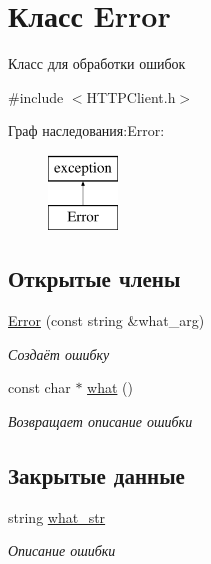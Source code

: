 \hypertarget{classError}{}\section{Класс Error}
\label{classError}


Класс для обработки ошибок  




{\ttfamily \#include $<$H\+T\+T\+P\+Client.\+h$>$}

Граф наследования\+:Error\+:\begin{figure}[H]
\begin{center}
\leavevmode
\includegraphics[height=2.000000cm]{classError}
\end{center}
\end{figure}
\subsection*{Открытые члены}
\begin{DoxyCompactItemize}
\item 
\mbox{\hyperlink{classError_a66e4b23485049435a2d454f80083f38c}{Error}} (const string \&what\+\_\+arg)
\begin{DoxyCompactList}\small\item\em Создаёт ошибку \end{DoxyCompactList}\item 
const char $\ast$ \mbox{\hyperlink{classError_a57dd37fd445e3182ed9da6ebfd2a28c0}{what}} ()
\begin{DoxyCompactList}\small\item\em Возвращает описание ошибки \end{DoxyCompactList}\end{DoxyCompactItemize}
\subsection*{Закрытые данные}
\begin{DoxyCompactItemize}
\item 
\mbox{\label{classError_aa6c7eb4e44e5965476c534c1b3fa1d0e}} 
string \mbox{\hyperlink{classError_aa6c7eb4e44e5965476c534c1b3fa1d0e}{what\+\_\+str}}
\begin{DoxyCompactList}\small\item\em Описание ошибки \end{DoxyCompactList}\end{DoxyCompactItemize}


